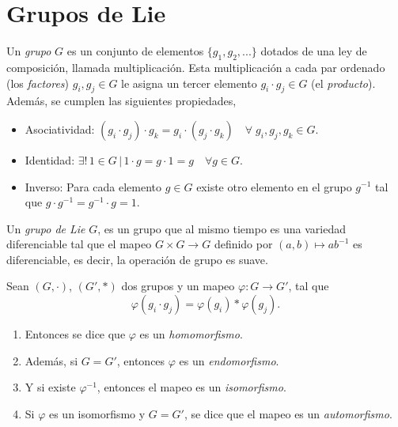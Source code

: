 
\section{Grupos de Lie}

\begin{mydef}[Grupo]
Un \emph{grupo} $G$ es un conjunto de elementos $\{g_{1}, g_{2}, ...\}$ dotados de una ley de composici\'{o}n, llamada multiplicaci\'{o}n. Esta multiplicaci\'{o}n a cada par ordenado (los \emph{factores}) $g_{i}, g_{j} \in G$  le asigna un tercer elemento $g_{i} \cdot g_{j} \in G$ (el \emph{producto}). Adem\'{a}s, se cumplen las siguientes propiedades,
%
\begin{itemize}
\item{Asociatividad: $(g_{i} \cdot g_{j}) \cdot g_{k} = g_{i} \cdot (g_{j} \cdot g_{k}) \quad \forall \; g_{i}, g_{j}, g_{k} \in G$.}
\item{Identidad: $\exists! \, 1 \in G \, \vert \, 1 \cdot g = g \cdot 1 = g \quad \forall g \in G$.}
\item{Inverso: Para cada elemento $g \in G$ existe otro elemento en el grupo $g^{-1}$ tal que $g \cdot g^{-1} = g^{-1} \cdot g = 1$.}
\end{itemize}
%
\end{mydef}

\begin{mydef}
Un \emph{grupo de Lie} $G$, es un grupo que al mismo tiempo es una variedad diferenciable tal que el mapeo $G \times G \rightarrow G$ definido por $(a, b) \mapsto a b^{-1}$ es diferenciable, es decir, la operaci\'{o}n de grupo es suave.
\end{mydef}

\begin{mydef}
Sean $(G, \cdot)$, $(G', \ast)$ dos grupos y un mapeo $\varphi: G \longrightarrow G'$, tal que $$\varphi(g_{i} \cdot g_{j}) = \varphi(g_{i}) \ast \varphi(g_{j}).$$
%
\begin{enumerate}
\item{Entonces se dice que $\varphi$ es un \emph{homomorfismo}.}
\item{Adem\'{a}s, si $G = G'$, entonces $\varphi$ es un \emph{endomorfismo}.}
\item{Y si existe $\varphi^{-1}$, entonces el mapeo es un \emph{isomorfismo}.}
\item{Si $\varphi$ es un isomorfismo y $G=G'$, se dice que el mapeo es un \emph{automorfismo}.}
\end{enumerate}
%
\end{mydef}

